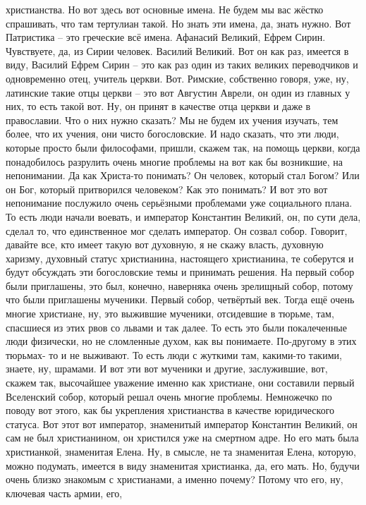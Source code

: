христианства. Но вот здесь вот основные имена. Не будем мы вас жёстко
спрашивать, что там тертулиан такой. Но знать эти имена, да, знать нужно. Вот
Патристика – это греческие всё имена. Афанасий Великий, Ефрем Сирин. Чувствуете,
да, из Сирии человек. Василий Великий. Вот он как раз, имеется в виду, Василий
Ефрем Сирин – это как раз один из таких великих переводчиков и одновременно
отец, учитель церкви. Вот. Римские, собственно говоря, уже, ну, латинские такие
отцы церкви – это вот Августин Аврели, он один из главных у них, то есть такой
вот. Ну, он принят в качестве отца церкви и даже в православии. Что о них нужно
сказать? Мы не будем их учения изучать, тем более, что их учения, они чисто
богословские. И надо сказать, что эти люди, которые просто были философами,
пришли, скажем так, на помощь церкви, когда понадобилось разрулить очень многие
проблемы на вот как бы возникшие, на непонимании. Да как Христа-то понимать? Он
человек, который стал Богом? Или он Бог, который притворился человеком? Как это
понимать? И вот это вот непонимание послужило очень серьёзными проблемами уже
социального плана. То есть люди начали воевать, и император Константин Великий,
он, по сути дела, сделал то, что единственное мог сделать император. Он созвал
собор. Говорит, давайте все, кто имеет такую вот духовную, я не скажу власть,
духовную харизму, духовный статус христианина, настоящего христианина, те
соберутся и будут обсуждать эти богословские темы и принимать решения. На первый
собор были приглашены, это был, конечно, наверняка очень зрелищный собор, потому
что были приглашены мученики. Первый собор, четвёртый век. Тогда ещё очень
многие христиане, ну, это выжившие мученики, отсидевшие в тюрьме, там, спасшиеся
из этих рвов со львами и так далее. То есть это были покалеченные люди
физически, но не сломленные духом, как вы понимаете. По-другому в этих тюрьмах-
то и не выживают. То есть люди с жуткими там, какими-то такими, знаете, ну,
шрамами. И вот эти вот мученики и другие, заслужившие, вот, скажем так,
высочайшее уважение именно как христиане, они составили первый Вселенский собор,
который решал очень многие проблемы. Немножечко по поводу вот этого, как бы
укрепления христианства в качестве юридического статуса. Вот этот вот император,
знаменитый император Константин Великий, он сам не был христианином, он
христился уже на смертном адре. Но его мать была христианкой, знаменитая Елена.
Ну, в смысле, не та знаменитая Елена, которую, можно подумать, имеется в виду
знаменитая христианка, да, его мать. Но, будучи очень близко знакомым с
христианами, а именно почему? Потому что его, ну, ключевая часть армии, его,

